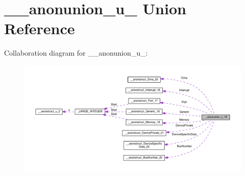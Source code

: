 \hypertarget{union____anonunion__u__15}{}\section{\+\_\+\+\_\+anonunion\+\_\+u\+\_ Union Reference}
\label{union____anonunion__u__15}


Collaboration diagram for \+\_\+\+\_\+anonunion\+\_\+u\+\_\+:
\nopagebreak
\begin{figure}[H]
\begin{center}
\leavevmode
\includegraphics[width=350pt]{union____anonunion__u__15__coll__graph}
\end{center}
\end{figure}
